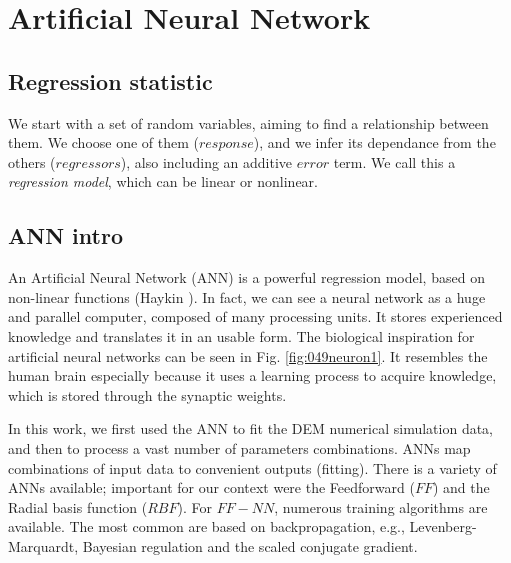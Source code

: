 
\chapter{Artificial Neural Network}
\label{cap:ann}

\section{Regression statistic}
\label{sec:regressionstatistic}

We start with a set of random variables, aiming to find a relationship between
them. We choose one of them ($response$), and we infer its dependance from the
others ($regressors$), also including an additive $error$ term. We call this a
\textit{regression model}, which can be linear or nonlinear.

\section{ANN intro}
\label{sec:annintro}
An Artificial Neural Network (\acs{ANN}) is a powerful regression model, 
based on non-linear functions (Haykin \cite{RefWorks:158}). 
In fact, we can see a neural network as a huge and parallel computer, composed
of many processing units. It stores experienced knowledge and translates it in
an usable form. 
The biological inspiration for artificial neural networks can be seen in Fig.
\ref{fig:049neuron1}. It resembles the human brain especially because it
uses a learning process to acquire knowledge, which is stored through the
synaptic weights.



In this work, we first used the \acs{ANN} to fit the \acs{DEM} numerical simulation
data, and then to process a vast number of parameters combinations. 
\acs{ANNs} map combinations of input data to convenient outputs (fitting). 
There is a variety of \acs{ANNs} available; important for our context were the
Feedforward ($FF$) and the Radial basis function ($RBF$). 
For $FF-NN$, 
numerous training algorithms are available. The most common are based on
backpropagation, e.g., Levenberg-Marquardt, Bayesian regulation and the scaled
conjugate gradient.

